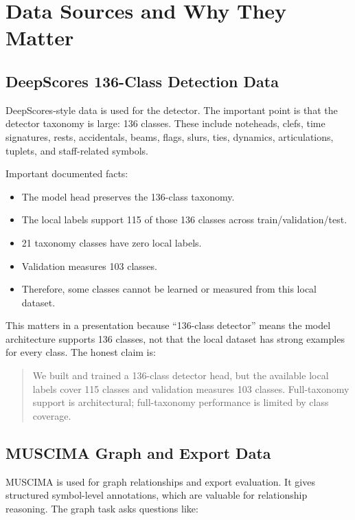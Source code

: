 \documentclass[11pt]{article}
\begin{document}
\section{Data Sources and Why They Matter}

\subsection{DeepScores 136-Class Detection Data}

DeepScores-style data is used for the detector. The important point is that the detector taxonomy is large: 136 classes. These include noteheads, clefs, time signatures, rests, accidentals, beams, flags, slurs, ties, dynamics, articulations, tuplets, and staff-related symbols.

Important documented facts:

\begin{itemize}
  \item The model head preserves the 136-class taxonomy.
  \item The local labels support 115 of those 136 classes across train/validation/test.
  \item 21 taxonomy classes have zero local labels.
  \item Validation measures 103 classes.
  \item Therefore, some classes cannot be learned or measured from this local dataset.
\end{itemize}

This matters in a presentation because ``136-class detector'' means the model architecture supports 136 classes, not that the local dataset has strong examples for every class. The honest claim is:

\begin{quote}
We built and trained a 136-class detector head, but the available local labels cover 115 classes and validation measures 103 classes. Full-taxonomy support is architectural; full-taxonomy performance is limited by class coverage.
\end{quote}

\subsection{MUSCIMA Graph and Export Data}

MUSCIMA is used for graph relationships and export evaluation. It gives structured symbol-level annotations, which are valuable for relationship reasoning. The graph task asks questions like:
\end{document}
